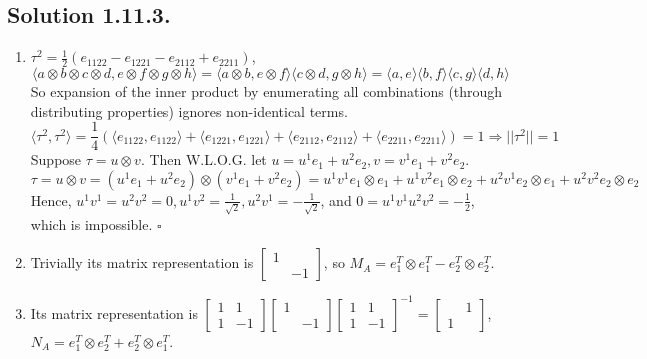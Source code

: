 \documentclass{article}
\begin{document}
\subsection*{Solution 1.11.3.}
\begin{enumerate}
    \item $\tau^2 = \frac{1}{2}(e_{1122}-e_{1221}-e_{2112}+e_{2211})$, 
    $$\langle a\otimes b\otimes c \otimes d, e\otimes f \otimes g \otimes h\rangle = \langle a\otimes b, e\otimes f\rangle \langle c\otimes d, g\otimes h\rangle = \langle a,e\rangle\langle b,f\rangle\langle c,g\rangle\langle d,h\rangle $$
    So expansion of the inner product by enumerating all combinations (through distributing properties) ignores non-identical terms.
    \[\langle \tau^2,\tau^2\rangle = \frac{1}{4}\left(
    \langle e_{1122}, e_{1122}\rangle +\langle e_{1221}, e_{1221}\rangle + \langle e_{2112}, e_{2112}\rangle +\langle e_{2211}, e_{2211}\rangle \right) = 1\Rightarrow ||\tau^2|| = 1\]
    Suppose $\tau = u\otimes v$. Then W.L.O.G. let $u = u^1e_1+u^2e_2, v=v^1e_1+v^2e_2$. 
    \[\tau = u\otimes v = (u^1e_1+u^2e_2)\otimes (v^1e_1+v^2e_2) = u^1v^1e_1\otimes e_1 + u^1v^2e_1\otimes e_2 + u^2v^1e_2\otimes e_1 + u^2v^2 e_2\otimes e_2\]
    Hence, $u^1v^1=u^2v^2=0,u^1v^2=\frac{1}{\sqrt{2}}, u^2v^1 = -\frac{1}{\sqrt{2}}$, and $0 = u^1v^1u^2v^2 = -\frac{1}{2}$, which is impossible. $\square$
    \item Trivially its matrix representation is $\left[\begin{array}{cc} 1 \\ & -1 \end{array}\right]$, so $M_A = e_1^T \otimes e_1^T - e_2^T \otimes e_2^T$.
    \item Its matrix representation is $
    \left[\begin{array}{cc} 1 & 1 \\ 1 & -1 \end{array}\right]
    \left[\begin{array}{cc} 1 \\ & -1 \end{array}\right]
    \left[\begin{array}{cc} 1 & 1\\ 1 & -1 \end{array}\right] ^ {-1} = \left[\begin{array}{cc}  & 1 \\ 1 \end{array}\right]$, \\
    $N_A = e_1^T \otimes e_2^T + e_2^T \otimes e_1^T$.

\end{enumerate}
\end{document}
